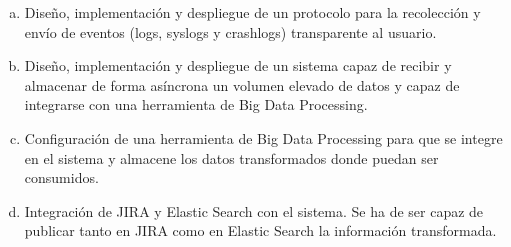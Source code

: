 \begin{enumerate}[a)]
	\item Diseño, implementación y despliegue de un protocolo para la recolección y envío de eventos (logs, syslogs y crashlogs) transparente al usuario.
	
	\item Diseño, implementación y despliegue de un sistema capaz de recibir y almacenar de forma asíncrona un volumen elevado de datos y capaz de integrarse con una herramienta de Big Data Processing.
	
	\item Configuración de una herramienta de Big Data Processing para que se integre en el sistema y almacene los datos transformados donde puedan ser consumidos.
	
	\item Integración de JIRA y Elastic Search con el sistema. Se ha de ser capaz de publicar tanto en JIRA como en Elastic Search la información transformada.
\end{enumerate}


